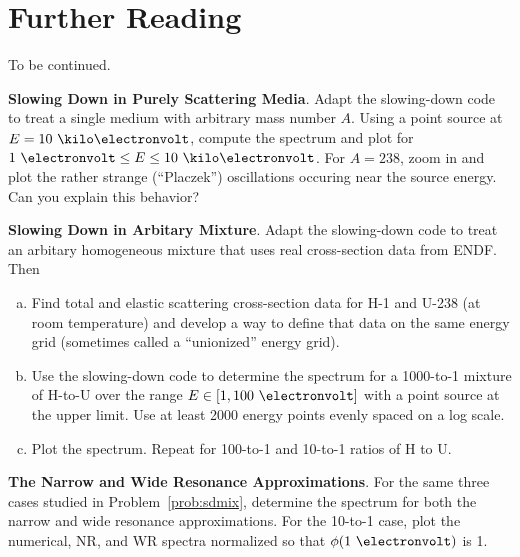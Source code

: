 \section*{Further Reading}

To be continued.


\begin{exercises}

  \item \textbf{Slowing Down in Purely Scattering Media}. 
    Adapt the slowing-down code to treat a single medium with arbitrary
    mass number $A$.
    Using a point source at $E=10~\kilo\electronvolt$, compute the spectrum and plot 
    for $1~\electronvolt \leq E \leq 10~\kilo\electronvolt$.
    For $A=238$, zoom in and plot the rather strange (``Placzek'') 
    oscillations occuring 
    near the source energy.  Can you explain this behavior?
    
  \item \textbf{Slowing Down in Arbitary Mixture}. 
    \label{prob:sdmix}
    Adapt the slowing-down code to treat an arbitary homogeneous
    mixture that uses real cross-section data from ENDF. Then
    \begin{enumerate}[(a)]
     \item Find total and elastic scattering cross-section data for 
           H-1 and U-238 (at room temperature) 
           and develop a way to define that data on 
           the same energy grid (sometimes called a ``unionized'' energy 
           grid).  
     \item Use the slowing-down code to determine the spectrum for 
           a 1000-to-1 mixture of H-to-U over 
           the range $E\in[1,100~\electronvolt]$ with a point source 
           at the upper limit.  Use at least 2000 energy points evenly
           spaced on a log scale.
     \item Plot the spectrum.  Repeat for 100-to-1 and 10-to-1 ratios 
           of H to U.
    \end{enumerate}

  \item \textbf{The Narrow and Wide Resonance Approximations}. 
    For the same three cases studied in Problem~\ref{prob:sdmix}, determine 
    the spectrum for both the narrow and wide resonance approximations.
    For the 10-to-1 case, plot the numerical, NR, and WR spectra normalized
    so that $\phi(1~\electronvolt)$ is 1.

    
\end{exercises}